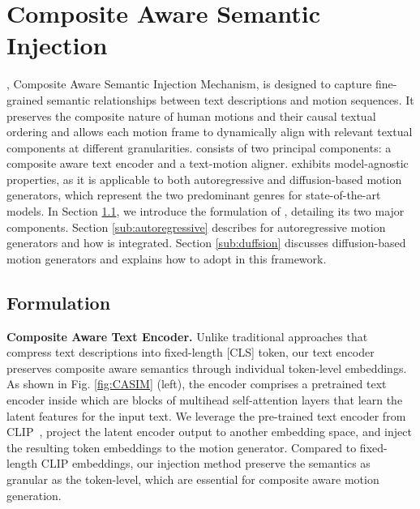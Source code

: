 \vspace{-5pt}
\section{Composite Aware Semantic Injection} \label{sec:casim}
\vspace{-1pt}

{\modulename}, Composite Aware Semantic Injection Mechanism, is designed to capture fine-grained semantic relationships between text descriptions and motion sequences. It preserves the composite nature of human motions and their causal textual ordering and allows each motion frame to dynamically align with relevant textual components at different granularities.
{\modulename} consists of two principal components: a composite aware text encoder and a text-motion aligner. 
{\modulename} exhibits model-agnostic properties, as it is applicable to both autoregressive and diffusion-based motion generators, which represent the two predominant genres for state-of-the-art models. 
In Section \ref{sub:formulation}, we introduce the formulation of {\modulename}, detailing its two major components. 
Section \ref{sub:autoregressive} describes for autoregressive motion generators and how {\modulename} is integrated. 
Section \ref{sub:duffsion} discusses diffusion-based motion generators and explains how to adopt {\modulename} 
in this framework.


\vspace{-3pt}
\subsection{{\modulename} Formulation} %
\label{sub:formulation}
\vspace{-3pt}

\textbf{Composite Aware Text Encoder.} Unlike traditional approaches that compress text descriptions into fixed-length [CLS] token, our text encoder preserves composite aware semantics through individual token-level embeddings. 
As shown in Fig. \ref{fig:CASIM} (left), the encoder comprises a pretrained text encoder inside which are blocks of multihead self-attention layers that learn the latent features for the input text. 
We leverage the pre-trained text encoder from CLIP~\cite{radford2021learning}, project the latent encoder output to another embedding space, and inject the resulting token embeddings to the motion generator.
Compared to fixed-length CLIP embeddings, our injection method preserve the semantics as granular as the token-level, which are essential for composite aware motion generation.

